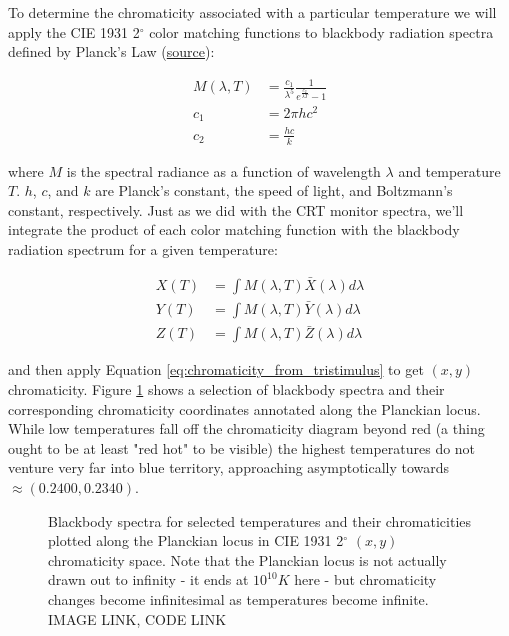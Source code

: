 \documentclass{article}
\newif\ifinvert
\begin{document}
To determine the chromaticity associated with a particular temperature we will apply the CIE 1931 2$^\circ$ color matching functions to blackbody radiation spectra defined by Planck’s Law (\href{https://en.wikipedia.org/wiki/Planckian_locus}{source}):

\begin{equation} %
    \begin{aligned}
        M(\lambda,T)&=\frac{c_1}{\lambda^5}\frac{1}{e^{\frac{c_2}{\lambda T}}-1}\\
        c_1&=2\pi hc^2\\
        c_2&=\frac{hc}{k}
    \end{aligned}
\end{equation}

where $M$ is the spectral radiance as a function of wavelength $\lambda$ and temperature $T$.  $h$, $c$, and $k$ are Planck's constant, the speed of light, and Boltzmann's constant, respectively.  Just as we did with the CRT monitor spectra, we'll integrate the product of each color matching function with the blackbody radiation spectrum for a given temperature:

\begin{equation} %
    \begin{aligned}
        X(T)&=\int M(\lambda,T)\bar{X}(\lambda)d\lambda\\
        Y(T)&=\int M(\lambda,T)\bar{Y}(\lambda)d\lambda\\
        Z(T)&=\int M(\lambda,T)\bar{Z}(\lambda)d\lambda
    \end{aligned}
\end{equation}

and then apply Equation \ref{eq:chromaticity_from_tristimulus} to get $(x,y)$ chromaticity.  Figure \ref{fig:blackbody_spectra} shows a selection of blackbody spectra and their corresponding chromaticity coordinates annotated along the Planckian locus.  While low temperatures fall off the chromaticity diagram beyond red (a thing ought to be at least "red hot" to be visible) the highest temperatures do not venture very far into blue territory, approaching asymptotically towards $\approx(0.2400, 0.2340)$.

\begin{figure} %
    \ifinvert
        
    \else
        
    \fi
    \caption{Blackbody spectra for selected temperatures and their chromaticities plotted along the Planckian locus in CIE 1931 2$^\circ$ $(x,y)$ chromaticity space.  Note that the Planckian locus is not actually drawn out to infinity - it ends at $10^{10}K$ here - but chromaticity changes become infinitesimal as temperatures become infinite.  IMAGE LINK, CODE LINK}\label{fig:blackbody_spectra}
\end{figure}
\end{document}
